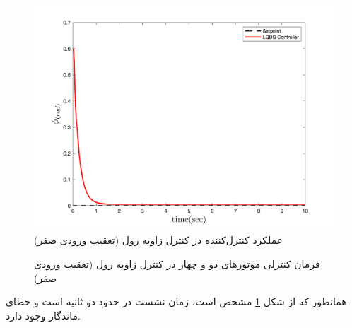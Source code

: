 \documentclass{CCI2020}
\begin{document}
	\begin{figure}[H]
		\includegraphics[width=.48\linewidth]{../Figures/MIL/LQDG/Roll/lqdg_roll_nn.png}
		\centering
		\caption{عملكرد کنترل‌کننده  در کنترل زاويه رول (تعقیب ورودی صفر)}
		\label{lqdg_roll_fig_simulation}
	\end{figure}
	\begin{figure}[H]
		\centering
		\caption{فرمان کنترلی موتورهای دو و چهار در کنترل زاویه رول (تعقیب ورودی صفر)}
	\end{figure}
	 همانطور که از شکل
	\ref{lqdg_roll_fig_simulation}
	مشخص است، زمان نشست در حدود دو ثانیه است و خطای ماندگار وجود دارد.
	
	
\end{document}
